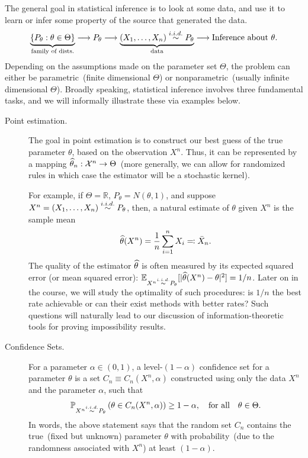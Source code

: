\documentclass[12pt]{article}
\begin{document}
The general goal in statistical inference is to look at some data, and use it to learn or infer some property of the source that generated the data. 
\begin{align}
\underbrace{\{P_\theta: \theta \in \Theta\}}_{\text{family of dists.}} \longrightarrow P_\theta \longrightarrow \underbrace{(X_1, \ldots, X_n) \stackrel{i.i.d.}{\sim} P_\theta}_{\text{data}} \longrightarrow \mathrm{Inference~about~} \theta.
\end{align}
Depending on the assumptions made on the parameter set $\Theta$, the problem can either be parametric~(finite dimensional $\Theta$) or nonparametric~(usually infinite dimensional $\Theta$). 
Broadly speaking, statistical inference involves three fundamental tasks, and we will informally illustrate these via examples below. 
\begin{description}
    \item[Point estimation.] The goal in point estimation is to construct our best guess of the true parameter $\theta$, based on the observation $X^n$. Thus, it can be represented by a mapping $\widehat{\theta}_n: {\cal X}^n \to \Theta$~(more generally, we can allow for randomized rules in which case the estimator will be a stochastic kernel). 
    
    For example, if $\Theta = \mathbb{R}$,  $P_\theta = N(\theta, 1)$,  and suppose $X^n = (X_1, \ldots, X_n) \stackrel{i.i.d.}{\sim} P_\theta$, then, a natural estimate of $\theta$ given $X^n$ is the sample mean 
    \begin{align}
    \widehat{\theta}(X^n) = \frac{1}{n} \sum_{i=1}^n X_i \eqcolon \bar{X}_n. 
    \end{align}
    \sloppy The quality of the estimator $\widehat{\theta}$ is often measured by its expected squared error (or mean squared error): $\mathbb{E}_{X^n \stackrel{i.i.d.}{\sim} P_\theta}[|\widehat{\theta}(X^n) - \theta|^2] = 1/n$. Later on in the course, we will study the optimality of such procedures: is $1/n$ the best rate achievable or can their exist methods with better rates? Such questions will naturally lead to our discussion of information-theoretic tools for proving impossibility results. 

    \item[Confidence Sets.] For a parameter $\alpha \in (0,1)$, a level-$(1-\alpha)$ confidence set for a parameter $\theta$ is a set $C_n \equiv C_n(X^n, \alpha)$ constructed using only the data $X^n$ and the parameter $\alpha$, such that 
    \begin{align}
        \mathbb{P}_{X^n \stackrel{i.i.d.}{\sim} P_\theta} \left( \theta \in C_n(X^n, \alpha) \right) \geq 1-\alpha, \quad \text{for all} \quad \theta \in \Theta. 
    \end{align}
    In words, the above statement says that the random set $C_n$ contains the true~(fixed but unknown) parameter $\theta$ with probability~(due to the randomness associated with $X^n$) at least $(1-\alpha)$. 



\end{description}
\end{document}
